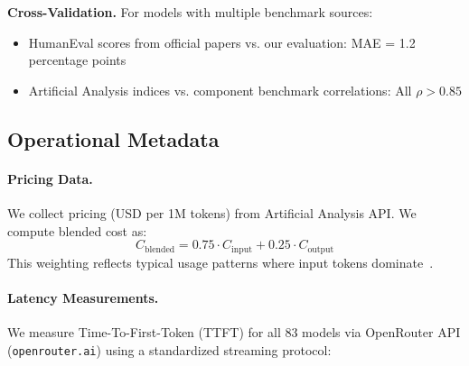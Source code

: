 \textbf{Cross-Validation.} For models with multiple benchmark sources:
%
\begin{itemize}[nosep]
\item HumanEval scores from official papers vs. our evaluation: MAE = 1.2 percentage points
\item Artificial Analysis indices vs. component benchmark correlations: All $\rho > 0.85$
\end{itemize}

\subsection{Operational Metadata}

\paragraph{Pricing Data.}
We collect pricing (USD per 1M tokens) from Artificial Analysis API. We compute blended cost as:
%
\begin{equation}
C_{\text{blended}} = 0.75 \cdot C_{\text{input}} + 0.25 \cdot C_{\text{output}}
\end{equation}
%
This weighting reflects typical usage patterns where input tokens dominate~\cite{zhao2024llmcost}.

\paragraph{Latency Measurements.}
We measure Time-To-First-Token (TTFT) for all 83 models via OpenRouter API (\texttt{openrouter.ai}) using a standardized streaming protocol:

